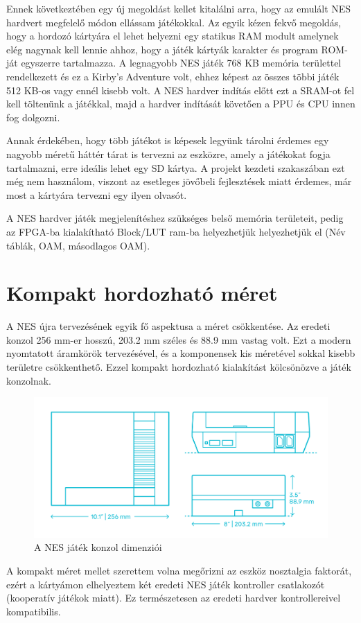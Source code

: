 Ennek következtében egy új megoldást kellet kitalálni arra, hogy az emulált NES hardvert megfelelő módon ellássam játékokkal. Az egyik kézen fekvő megoldás, hogy a hordozó kártyára el lehet helyezni egy statikus RAM modult amelynek elég nagynak kell lennie ahhoz, hogy a játék kártyák karakter és program ROM-ját egyszerre tartalmazza. A legnagyobb NES játék 768 KB memória területtel rendelkezett és ez a Kirby's Adventure volt, ehhez képest az összes többi játék 512 KB-os vagy ennél kisebb volt. A NES hardver indítás előtt ezt a SRAM-ot fel kell töltenünk a játékkal, majd a hardver indítását követően a PPU és CPU innen fog dolgozni.

Annak érdekében, hogy több játékot is képesek legyünk tárolni érdemes egy nagyobb méretű háttér tárat is tervezni az eszközre, amely a játékokat fogja tartalmazni, erre ideális lehet egy SD kártya. A projekt kezdeti szakaszában ezt még nem használom, viszont az esetleges jövőbeli fejlesztések miatt érdemes, már most a kártyára tervezni egy ilyen olvasót.

A NES hardver játék megjelenítéshez szükséges belső memória területeit, pedig az FPGA-ba kialakítható Block/LUT ram-ba helyezhetjük helyezhetjük el (Név táblák, OAM, másodlagos OAM).

\section{Kompakt hordozható méret}
\label{sec:Size}

A NES újra tervezésének egyik fő aspektusa a méret csökkentése. Az eredeti konzol 256 mm-er hosszú, 203.2 mm széles és 88.9 mm vastag volt. Ezt a modern nyomtatott áramkörök tervezésével, és a komponensek kis méretével sokkal kisebb területre csökkenthető. Ezzel kompakt hordozható kialakítást kölcsönözve a játék konzolnak.

\begin{figure}[H]
	\centering
	\includegraphics[width=150mm, keepaspectratio]{figures/NES-size}
	\caption{A NES játék konzol dimenziói}
	\label{fig:NES-size}
\end{figure}

A kompakt méret mellet szerettem volna megőrizni az eszköz nosztalgia faktorát, ezért a kártyámon elhelyeztem két eredeti NES játék kontroller csatlakozót (kooperatív játékok miatt). Ez természetesen az eredeti hardver kontrollereivel kompatibilis.


